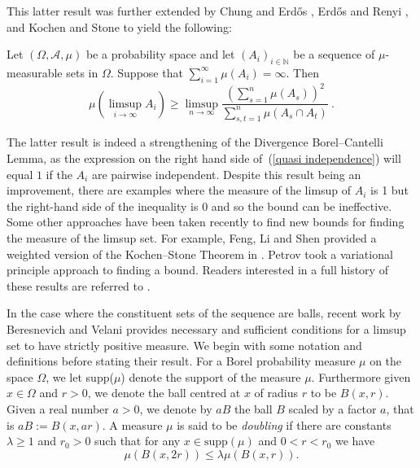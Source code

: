 \documentclass[12pt]{article}
\begin{document}
This latter result was further extended by Chung and Erd\H{o}s \cite{ErdosChungpaper}, Erd\H{o}s and Renyi \cite{ErdosRenyi}, and Kochen and Stone \cite{kochenstone} to yield the following:

\begin{theoremKS*}\label{Kochen stone theorem}
Let $(\Omega, \mathscr{A}, \mu)$ be a probability space and let $(A_i)_{i \in \mathbb{N}}$ be a sequence of $\mu$-measurable sets in $\Omega$. Suppose that $\sum_{i=1}^{\infty} \mu(A_i)=\infty$. Then
    \begin{equation} \label{quasi independence}
        \mu\left(\limsup_{i \rightarrow \infty} A_i \right) \geq \limsup_{n \rightarrow \infty} \frac{\left( \sum_{s=1}^n \mu(A_s) \right)^2}{\sum_{s,t=1}^n \mu(A_s \cap A_t)} ~.
    \end{equation} 
\end{theoremKS*}

The latter result is indeed a strengthening of the Divergence Borel--Cantelli Lemma, as the expression on the right hand side of~(\ref{quasi independence}) will equal $1$ if the $A_i$ are pairwise independent. Despite this result being an improvement, there are examples where the measure of the limsup of $A_i$ is 1 but the right-hand side of the inequality is 0 and so the bound can be ineffective. Some other approaches have been taken recently to find new bounds for finding the measure of the limsup set. For example, Feng, Li and Shen provided a weighted version of the Kochen--Stone Theorem in \cite{weightedBCpaper}. Petrov \cite{Petrov04} took a variational principle approach to finding a bound. Readers interested in a full history of these results are referred to \cite{Frolov2012}.



In the case where the constituent sets of the sequence are balls, recent work by Beresnevich and Velani \cite{Velanipaper} provides necessary and sufficient conditions for a limsup set to have strictly positive measure. We begin with some notation and definitions before stating their result. For a Borel probability measure $\mu$ on the space $\Omega$, we let supp($\mu$) denote the support of the measure $\mu$. Furthermore given $x \in \Omega$ and $r > 0$, we denote the ball centred at $x$ of radius $r$ to be $B(x,r)$. Given a real number $a > 0$, we denote by $aB$ the ball $B$ scaled by a factor $a$, that is
$aB := B(x, ar)$. A measure $\mu$ is said to be \textit{doubling} if there are constants $\lambda \geq 1$ and $r_0 >0$ such that for any $x \in \text{supp}(\mu)$ and $0 <r<r_0$ we have
\[\mu(B(x,2r)) \leq \lambda \mu(B(x,r)).\]
\end{document}
